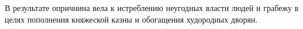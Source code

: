 \documentclass[12pt]{article}
\begin{document}
  В результате опричнина вела к истреблению неугодных власти людей и грабежу в целях пополнения княжеской казны и обогащения худородных дворян.


\end{document}
